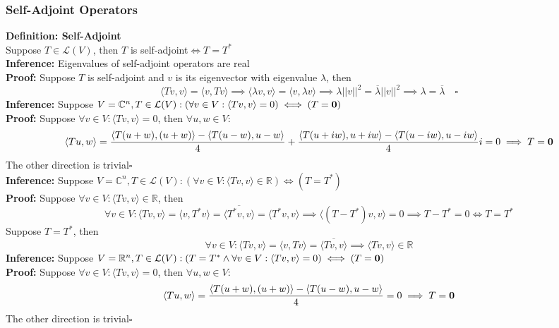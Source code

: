 \documentclass{article}
\newcommand{\R}{\mathbb{R}}
\newcommand{\0}{{\bf{0}}}
\begin{document}
\subsubsection{Self-Adjoint Operators}
\textbf{Definition: Self-Adjoint}\\
Suppose $T\in\mathcal{L}(V)$, then $T$ is self-adjoint$\iff T=T^*$\\
\textbf{Inference:} Eigenvalues of self-adjoint operators are real\\
\textbf{Proof:} Suppose $T$ is self-adjoint and $v$ is its eigenvector with eigenvalue $\lambda$, then
$$\langle Tv,v\rangle=\langle v,Tv\rangle\implies\langle\lambda v,v\rangle=\langle v,\lambda v\rangle\implies\lambda||v||^2=\overline{\lambda}||v||^2\implies\lambda=\overline{\lambda}\quad\square$$
\textbf{Inference:} Suppose $V=\mathbb{C}^n,T\in\mathcal{L}(V):(\forall v\in V:\langle Tv,v\rangle=0)\iff(T=\0)$\\
\textbf{Proof:}
Suppose $\forall v\in V:\langle Tv,v\rangle=0$, then $\forall u,w\in V:$
$$\langle Tu,w\rangle=\frac{\langle T(u+w),(u+w)\rangle-\langle T(u-w),u-w\rangle}{4}+\frac{\langle T(u+iw),u+iw\rangle-\langle T(u-iw),u-iw\rangle}{4}i=0\implies T=\0$$
The other direction is trivial\quad$\square$\\
\textbf{Inference:} Suppose $V=\mathbb{C}^n,T\in\mathcal{L}(V):(\forall v\in V:\langle Tv,v\rangle\in\R)\iff(T=T^*)$\\
\textbf{Proof:} Suppose $\forall v\in V:\langle Tv,v\rangle\in\R$, then
$$\forall v\in V:\langle Tv,v\rangle=\langle v,T^*v\rangle=\overline{\langle T^*v,v\rangle}=\langle T^*v,v\rangle\implies\langle(T-T^*)v,v\rangle=0\implies T-T^*=0\iff T=T^*$$
Suppose $T=T^*$, then
$$\forall v\in V:\langle Tv,v\rangle=\langle v,Tv\rangle=\overline{\langle Tv,v\rangle}\implies\langle Tv,v\rangle\in\R$$
\textbf{Inference:} Suppose $V=\R^n,T\in\mathcal{L}(V):(T=T^*\land\forall v\in V:\langle Tv,v\rangle=0)\iff(T=\0)$\\
\textbf{Proof:}
Suppose $\forall v\in V:\langle Tv,v\rangle=0$, then $\forall u,w\in V:$
$$\langle Tu,w\rangle=\frac{\langle T(u+w),(u+w)\rangle-\langle T(u-w),u-w\rangle}{4}=0\implies T=\0$$
The other direction is trivial\quad$\square$
\end{document}
